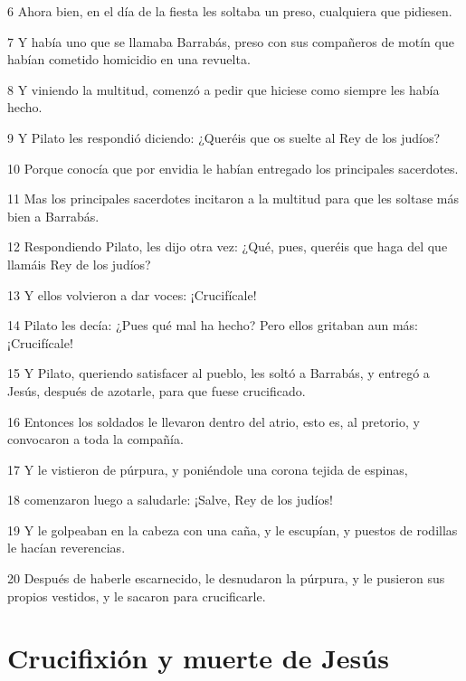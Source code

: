 \par 6 Ahora bien, en el día de la fiesta les soltaba un preso, cualquiera que pidiesen.
\par 7 Y había uno que se llamaba Barrabás, preso con sus compañeros de motín que habían cometido homicidio en una revuelta.
\par 8 Y viniendo la multitud, comenzó a pedir que hiciese como siempre les había hecho.
\par 9 Y Pilato les respondió diciendo: ¿Queréis que os suelte al Rey de los judíos?
\par 10 Porque conocía que por envidia le habían entregado los principales sacerdotes.
\par 11 Mas los principales sacerdotes incitaron a la multitud para que les soltase más bien a Barrabás.
\par 12 Respondiendo Pilato, les dijo otra vez: ¿Qué, pues, queréis que haga del que llamáis Rey de los judíos?
\par 13 Y ellos volvieron a dar voces: ¡Crucifícale!
\par 14 Pilato les decía: ¿Pues qué mal ha hecho? Pero ellos gritaban aun más: ¡Crucifícale!
\par 15 Y Pilato, queriendo satisfacer al pueblo, les soltó a Barrabás, y entregó a Jesús, después de azotarle, para que fuese crucificado.
\par 16 Entonces los soldados le llevaron dentro del atrio, esto es, al pretorio, y convocaron a toda la compañía.
\par 17 Y le vistieron de púrpura, y poniéndole una corona tejida de espinas,
\par 18 comenzaron luego a saludarle: ¡Salve, Rey de los judíos!
\par 19 Y le golpeaban en la cabeza con una caña, y le escupían, y puestos de rodillas le hacían reverencias.
\par 20 Después de haberle escarnecido, le desnudaron la púrpura, y le pusieron sus propios vestidos, y le sacaron para crucificarle.

\section*{Crucifixión y muerte de Jesús}

